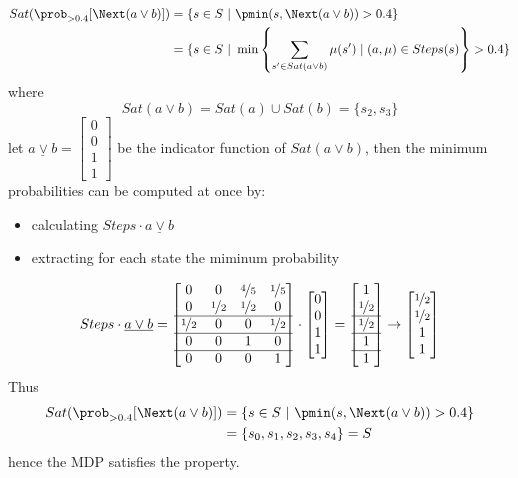 \begin{align*}
	Sat(\prob_{>0.4} [\Next (a \vee b)]) & = \{ s \in S\ |\ \pmin(s, \Next (a \vee b)) > 0.4\}                                                            \\
	                                     & = \{ s \in S\ |\ \min \left\{ \sum_{s' \in Sat(a \vee b)} \mu(s') \mid (a, \mu) \in Steps(s) \right\} > 0.4 \} \\
\end{align*}
where
\[
	Sat(a \vee b) = Sat(a) \cup Sat(b) = \{ s_2, s_3 \}
\]
let $\underline{a \vee b} = \begin{bmatrix} 0 \\ 0 \\ 1 \\ 1 \end{bmatrix}$ be
the indicator function of $Sat(a \vee b)$, then the minimum probabilities can
be computed at once by:
\begin{itemize}
	\item calculating $Steps \cdot \underline{a \vee b}$
	\item extracting for each state the miminum probability
\end{itemize}
\[
	Steps \cdot \underline{a \vee b} =
	\begin{bmatrix}
		0               & 0               & \nicefrac{4}{5} & \nicefrac{1}{5} \\
		0               & \nicefrac{1}{2} & \nicefrac{1}{2} & 0               \\
		\hline
		\nicefrac{1}{2} & 0               & 0               & \nicefrac{1}{2} \\
		\hline
		0               & 0               & 1               & 0               \\
		\hline
		0               & 0               & 0               & 1
	\end{bmatrix}
	\cdot
	\begin{bmatrix} 0 \\ 0 \\ 1 \\ 1 \end{bmatrix} =
	\begin{bmatrix}
		1               \\
		\nicefrac{1}{2} \\
		\hline
		\nicefrac{1}{2} \\
		\hline
		1               \\
		\hline
		1
	\end{bmatrix} \to
	\begin{bmatrix}
		\nicefrac{1}{2} \\
		\nicefrac{1}{2} \\
		1               \\
		1
	\end{bmatrix}
\]
Thus
\begin{align*}
	Sat(\prob_{>0.4} [\Next (a \vee b)]) & = \{ s \in S\ |\ \pmin(s, \Next (a \vee b)) > 0.4\} \\
	                                     & = \{ s_0, s_1, s_2, s_3, s_4 \} = S
\end{align*}
hence the MDP satisfies the property.

